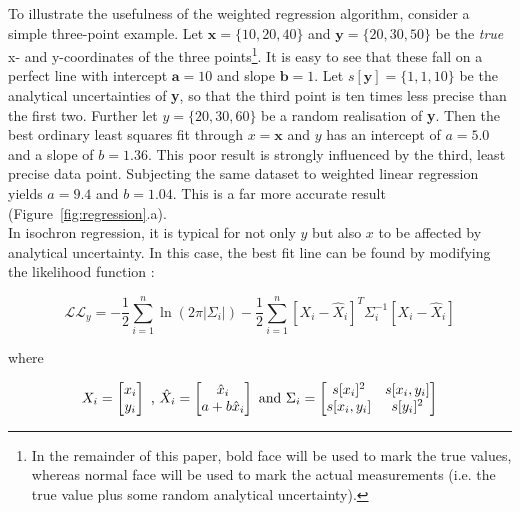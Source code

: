 \begin{refsection}
To illustrate the usefulness of the weighted regression algorithm,
consider a simple three-point example. Let $\boldsymbol{x} = \{10, 20,
40\}$ and $\boldsymbol{y} = \{20,30,50\}$ be the \emph{true} x- and
y-coordinates of the three points\footnote{In the remainder of this
  paper, bold face will be used to mark the true values, whereas
  normal face will be used to mark the actual measurements (i.e. the
  true value plus some random analytical uncertainty).}. It is easy to
see that these fall on a perfect line with intercept $\boldsymbol{a} =
10$ and slope $\boldsymbol{b} = 1$. Let $s[\boldsymbol{y}] =
\{1,1,10\}$ be the analytical uncertainties of \textbf{y}, so that the
third point is ten times less precise than the first two. Further let
$y = \{20,30,60\}$ be a random realisation of \textbf{y}.  Then the
best ordinary least squares fit through $x = \boldsymbol{x}$ and $y$
has an intercept of $a = 5.0$ and a slope of $b = 1.36$. This poor
result is strongly influenced by the third, least precise data
point. Subjecting the same dataset to weighted linear regression
yields $a = 9.4$ and $b = 1.04$. This is a far more accurate result
(Figure~\ref{fig:regression}.a).\\

In isochron regression, it is typical for not only $y$ but also $x$ to
be affected by analytical uncertainty. In this case, the best fit line
can be found by modifying the likelihood function
\citep{titterington1979, york1969, york2004}:

\begin{equation}
  \mathcal{LL}_y = 
  -\frac{1}{2} \sum\limits_{i=1}^{n}
  \ln\left(2 \pi |\Sigma_i| \right)
  -\frac{1}{2} \sum\limits_{i=1}^{n}
  \left[X_i-\hat{X}_i\right]^T
  \Sigma_i^{-1}
  \left[X_i-\hat{X}_i\right]
  \label{eq:Ly}
\end{equation}

\noindent where

\begin{equation}
  X_i = \left[
    \begin{array}{@{}c@{}}
      x_i\\
      y_i\\
    \end{array}
    \right]
  \mbox{~,~}
  \hat{X}_i = \left[
    \begin{array}{@{}c@{}}
      \hat{x}_i \\
      a + b \hat{x}_i
    \end{array}
    \right]
  \mbox{~and~}
  \Sigma_i = \left[
    \begin{array}{@{}cc@{}}
      s[x_i]^2 & s[x_i,y_i] \\
      s[x_i,y_i] & s[y_i]^2
    \end{array}
    \right]
\end{equation}


\end{refsection}

